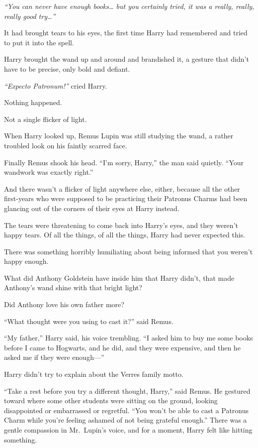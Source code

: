 \emph{``You can never have enough books\ldots{} but you certainly tried,
it was a really, really, really good try\ldots{}''}

It had brought tears to his eyes, the first time Harry had remembered
and tried to put it into the spell.

Harry brought the wand up and around and brandished it, a gesture that
didn't have to be precise, only bold and defiant.

\emph{``Expecto Patronum!''} cried Harry.

Nothing happened.

Not a single flicker of light.

When Harry looked up, Remus Lupin was still studying the wand, a rather
troubled look on his faintly scarred face.

Finally Remus shook his head. ``I'm sorry, Harry,'' the man said
quietly. ``Your wandwork was exactly right.''

And there wasn't a flicker of light anywhere else, either, because all
the other first-years who were supposed to be practicing their Patronus
Charms had been glancing out of the corners of their eyes at Harry
instead.

The tears were threatening to come back into Harry's eyes, and they
weren't happy tears. Of all the things, of all the things, Harry had
never expected this.

There was something horribly humiliating about being informed that you
weren't happy enough.

What did Anthony Goldstein have inside him that Harry didn't, that made
Anthony's wand shine with that bright light?

Did Anthony love his own father more?

``What thought were you using to cast it?'' said Remus.

``My father,'' Harry said, his voice trembling. ``I asked him to buy me
some books before I came to Hogwarts, and he did, and they were
expensive, and then he asked me if they were enough---''

Harry didn't try to explain about the Verres family motto.

``Take a rest before you try a different thought, Harry,'' said Remus.
He gestured toward where some other students were sitting on the ground,
looking disappointed or embarrassed or regretful. ``You won't be able to
cast a Patronus Charm while you're feeling ashamed of not being grateful
enough.'' There was a gentle compassion in Mr.~Lupin's voice, and for a
moment, Harry felt like hitting something.

